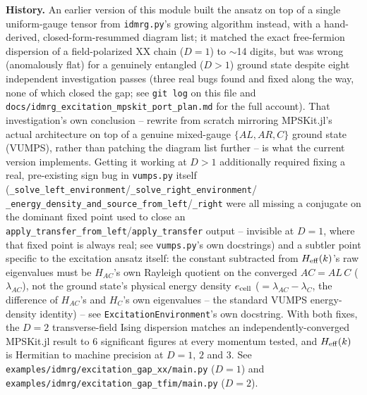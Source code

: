 \documentclass[11pt]{article}
\begin{document}
\textbf{History.} An earlier version of this module built the ansatz on
top of a single uniform-gauge tensor from \texttt{idmrg.py}'s growing
algorithm instead, with a hand-derived, closed-form-resummed diagram
list; it matched the exact free-fermion dispersion of a field-polarized
XX chain ($D=1$) to $\sim$14 digits, but was wrong (anomalously flat)
for a genuinely entangled ($D>1$) ground state despite eight
independent investigation passes (three real bugs found and fixed along
the way, none of which closed the gap; see \texttt{git log} on this
file and \texttt{docs/idmrg\_excitation\_mpskit\_port\_plan.md} for the
full account). That investigation's own conclusion -- rewrite from
scratch mirroring MPSKit.jl's actual architecture on top of a genuine
mixed-gauge $\{AL,AR,C\}$ ground state (VUMPS), rather than patching the
diagram list further -- is what the current version implements. Getting
it working at $D>1$ additionally required fixing a real, pre-existing
sign bug in \texttt{vumps.py} itself
(\texttt{\_solve\_left\_environment}/\texttt{\_solve\_right\_environment}/
\texttt{\_energy\_density\_and\_source\_from\_left}/\texttt{\_right}
were all missing a conjugate on the dominant fixed point used to close
an \texttt{apply\_transfer\_from\_left}/\texttt{apply\_transfer} output
-- invisible at $D=1$, where that fixed point is always real; see
\texttt{vumps.py}'s own docstrings) and a subtler point specific to the
excitation ansatz itself: the constant subtracted from $H_{\rm
eff}(k)$'s raw eigenvalues must be $H_{AC}$'s own Rayleigh quotient on
the converged $AC=AL\,C$ ($\lambda_{AC}$), not the ground state's
physical energy density $e_{\rm cell}$ ($=\lambda_{AC}-\lambda_C$, the
difference of $H_{AC}$'s and $H_C$'s own eigenvalues -- the standard
VUMPS energy-density identity) -- see \texttt{ExcitationEnvironment}'s
own docstring. With both fixes, the $D=2$ transverse-field Ising
dispersion matches an independently-converged MPSKit.jl result to 6
significant figures at every momentum tested, and $H_{\rm eff}(k)$ is
Hermitian to machine precision at $D=1$, $2$ and $3$. See
\texttt{examples/idmrg/excitation\_gap\_xx/main.py} ($D=1$) and
\texttt{examples/idmrg/excitation\_gap\_tfim/main.py} ($D=2$).
\end{document}

